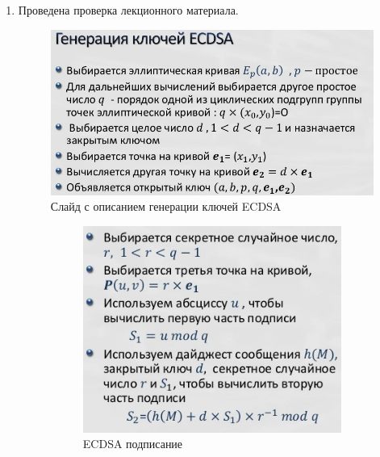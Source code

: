 \documentclass[a4paper, 14pt]{extarticle}
\begin{document}
\begin{enumerate}
    \item Проведена проверка лекционного материала.
    \begin{figure}[h]
        \centering
        \includegraphics[width=\textwidth]{img/S009.jpg}
        \caption{Слайд с описанием генерации ключей ECDSA}%
        \label{img:3:2}
    \end{figure}
    \begin{figure}[h]
        \centering
        \begin{subfigure}[b]{0.49\textwidth}
        	\includegraphics[width=\textwidth]{img/S011.jpg}
        	\caption{ECDSA подписание}
        \end{subfigure}%
        \hspace{6pt}
        \begin{subfigure}[b]{0.45\textwidth}

\end{subfigure}
\end{figure}
\end{enumerate}
\end{document}
